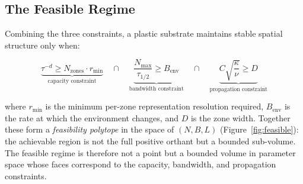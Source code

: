 \documentclass[11pt]{article}
\begin{document}
\subsection{The Feasible Regime}

Combining the three constraints, a plastic substrate maintains stable spatial structure only when:

\begin{equation}
  \underbrace{\tau^{-d} \geq N_{\text{zones}} \cdot r_{\min}}_{\text{capacity constraint}}
  \quad \cap \quad
  \underbrace{\frac{N_{\max}}{\tau_{1/2}} \geq B_{\text{env}}}_{\text{bandwidth constraint}}
  \quad \cap \quad
  \underbrace{C\sqrt{\frac{\kappa}{\nu}} \geq D}_{\text{propagation constraint}}
  \label{eq:feasible}
\end{equation}

where $r_{\min}$ is the minimum per-zone representation resolution required, $B_{\text{env}}$ is the rate at which the environment changes, and $D$ is the zone width.
Together these form a \emph{feasibility polytope} in the space of $(N, B, L)$ (Figure~\ref{fig:feasible}): the achievable region is not the full positive orthant but a bounded sub-volume.
The feasible regime is therefore not a point but a bounded volume in parameter space whose faces correspond to the capacity, bandwidth, and propagation constraints.
\end{document}
